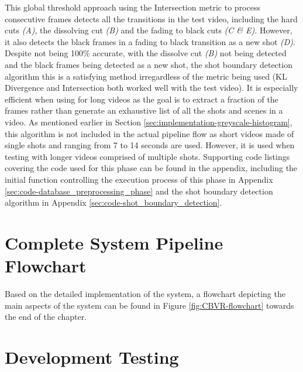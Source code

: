 This global threshold approach using the Intersection metric to process consecutive frames detects all the transitions in the test video, including the hard cuts \textit{(A)}, the dissolving cut \textit{(B)} and the fading to black cuts \textit{(C \& E)}. However, it also detects the black frames in a fading to black transition as a new shot \textit{(D)}.\\

Despite not being 100\% accurate, with the dissolve cut \textit{(B)} not being detected and the black frames being detected as a new shot, the shot boundary detection algorithm this is a satisfying method irregardless of the metric being used (KL Divergence and Intersection both worked well with the test video). It is especially efficient when using for long videos as the goal is to extract a fraction of the frames rather than generate an exhaustive list of all the shots and scenes in a video. As mentioned earlier in Section \ref{sec:implementation-greyscale-histogram}, this algorithm is not included in the actual pipeline flow as short videos made of single shots and ranging from 7 to 14 seconds are used. However, it is used when testing with longer videos comprised of multiple shots. Supporting code listings covering the code used for this phase can be found in the appendix, including the initial function controlling the execution process of this phase in Appendix \ref{sec:code-database_preprocessing_phase} and the shot boundary detection algorithm in Appendix \ref{sec:code-shot_boundary_detection}.


\section{Complete System Pipeline Flowchart}

Based on the detailed implementation of the system, a flowchart depicting the main aspects of the system can be found in Figure \ref{fig:CBVR-flowchart} towards the end of the chapter.


\section{Development Testing}

